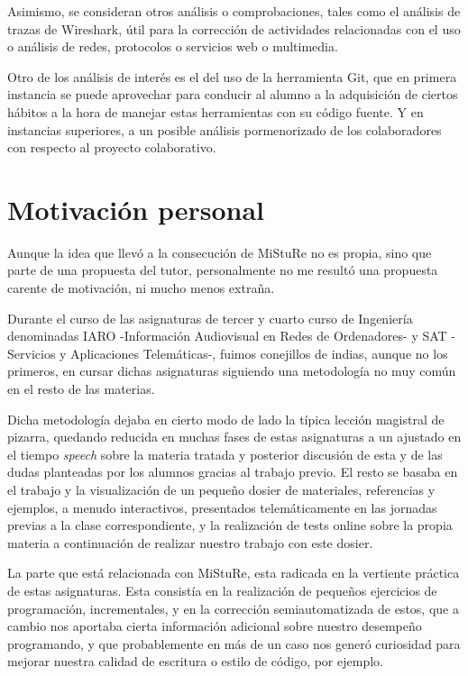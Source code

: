 Asimismo, se consideran otros análisis o comprobaciones, tales como el análisis de trazas de Wireshark, útil para la corrección de actividades relacionadas con el uso o análisis de redes, protocolos o servicios web o multimedia.


Otro de los análisis de interés es el del uso de la herramienta Git, que en primera instancia se puede aprovechar para conducir al alumno a la adquisición de ciertos hábitos a la hora de manejar estas herramientas con su código fuente. Y en instancias superiores, a un posible análisis pormenorizado de los colaboradores con respecto al proyecto colaborativo.


\section{Motivación personal}

Aunque la idea que llevó a la consecución de MiStuRe no es propia, sino que parte de una propuesta del tutor, personalmente no me resultó una propuesta carente de motivación, ni mucho menos extraña.


Durante el curso de las asignaturas de tercer y cuarto curso de Ingeniería denominadas IARO -Información Audiovisual en Redes de Ordenadores- y SAT -Servicios y Aplicaciones Telemáticas-, fuimos conejillos de indias, aunque no los primeros, en cursar dichas asignaturas siguiendo una metodología no muy común en el resto de las materias.


Dicha metodología dejaba en cierto modo de lado la típica lección magistral de pizarra, quedando reducida en muchas fases de estas asignaturas a un ajustado en el tiempo \textit{speech} sobre la materia tratada y posterior discusión de esta y de las dudas planteadas por los alumnos gracias al trabajo previo. El resto se basaba en el trabajo y la visualización de un pequeño dosier de materiales, referencias y ejemplos, a menudo interactivos, presentados telemáticamente en las jornadas previas a la clase correspondiente, y la realización de tests online sobre la propia materia a continuación de realizar nuestro trabajo con este dosier.


La parte que está relacionada con MiStuRe, esta radicada en la vertiente práctica de estas asignaturas. Esta consistía en la realización de pequeños ejercicios de programación, incrementales, y en la corrección semiautomatizada de estos, que a cambio nos aportaba cierta información adicional sobre nuestro desempeño programando, y que probablemente en más de un caso nos generó curiosidad para mejorar nuestra calidad de escritura o estilo de código, por ejemplo.


